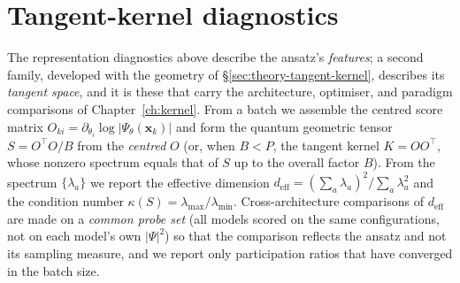 \section{Tangent-kernel diagnostics}
\label{sec:analysis-kernel}
The representation diagnostics above describe the ansatz's \emph{features}; a second
family, developed with the geometry of \S\ref{sec:theory-tangent-kernel}, describes its
\emph{tangent space}, and it is these that carry the architecture, optimiser, and
paradigm comparisons of Chapter~\ref{ch:kernel}. From a batch we assemble the centred
score matrix $O_{ki}=\partial_{\theta_i}\log|\Psi_\theta(\mathbf x_k)|$ and form the
quantum geometric tensor $S=O^{\!\top}O/B$ from the \emph{centred} $O$ (or, when $B<P$, the tangent kernel
$K=OO^{\!\top}$, whose nonzero spectrum equals that of $S$ up to the overall factor $B$). From the spectrum
$\{\lambda_a\}$ we report the effective dimension
$d_{\mathrm{eff}}=(\sum_a\lambda_a)^2/\sum_a\lambda_a^2$ and the condition number
$\kappa(S)=\lambda_{\max}/\lambda_{\min}$. Cross-architecture comparisons of
$d_{\mathrm{eff}}$ are made on a \emph{common probe set} (all models scored on the same configurations, not on each model's own $|\Psi|^2$) so that the comparison reflects the
ansatz and not its sampling measure, and we report only participation ratios that have
converged in the batch size.

